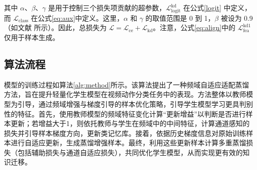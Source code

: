 \documentclass[10.5pt,letterpaper]{article}
\begin{document}
其中 \(\alpha\)、\(\beta\)、\(\gamma\) 是用于控制三个损失项贡献的超参数，\(\mathcal{L}_{\text{logit}}^{\text{kd}}\) 在公式\ref{logit} 中定义，而 \(\mathcal{L}_{\text{class}}\) 在公式\ref{eq:aux}中定义。这里，\(\alpha\) 和 \(\gamma\) 的取值范围是 0 到 1，\(\beta\) 被设为 0.9（如文献 \cite{wang-tip2024-dkd}所示）。因此，总损失为 \(\mathcal{L} = \mathcal{L}_{\text{ce}} + \mathcal{L}_{\text{kd}}\)。注意，公式\ref{eq:align}中的 \(\mathcal{L}_{\text{fea}}^{\text{kd1}}\) 仅用于样本生成。

\subsection{算法流程}
	模型的训练过程如算法\ref{alg:method}所示。该算法提出了一种频域自适应适配蒸馏方法，旨在提升轻量化学生模型在视频动作分类任务中的表现。方法整体以教师模型为引导，通过频域增强与梯度引导的样本优化策略，引导学生模型学习更具判别性的特征。首先，使用教师模型的频域特征变化计算“更新增益”以判断是否进行样本更新；若增益大于1，则依托教师与学生在频域中的中间特征，计算通道感知的损失并引导样本梯度方向，更新类记忆库。接着，依据历史梯度信息对原始训练样本进行自适应更新，生成蒸馏增强样本。最终，利用这些更新样本计算多重蒸馏损失（包括辅助损失与通道自适应损失），共同优化学生模型，从而实现更有效的知识迁移。
	
\end{document}
